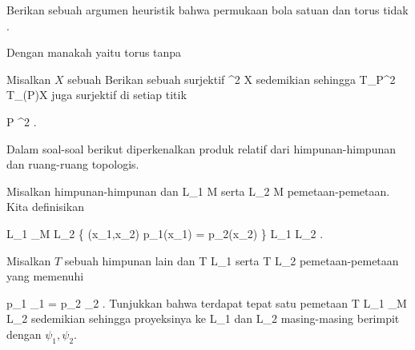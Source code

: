 {}
{

Berikan sebuah argumen heuristik bahwa permukaan bola satuan
 dan torus
 tidak
.

}
{} {}

{}
{

Dengan
manakah
 yaitu torus tanpa

}
{} {}

{}
{

Misalkan $X$ sebuah
Berikan sebuah
surjektif
\maabbdisp {\varphi} {\R^2} {X
} {}
sedemikian sehingga
 { T_P\R^2 } { T_{\varphi(P)}X
} {}
juga surjektif di setiap titik

\mavergleichskette
{\vergleichskette
{ P
}
{ \in }{ \R^2
}
{  }{
}
{    }{
}
{   }{
}
}
{}{}{}.

}
{} {}

Dalam soal-soal berikut diperkenalkan produk relatif dari himpunan-himpunan dan ruang-ruang topologis.

{}
{

Misalkan
 himpunan-himpunan dan
 {L_1 } { M
} {}
serta
 {L_2 } { M
} {}
pemetaan-pemetaan. Kita definisikan

\mavergleichskettedisp
{\vergleichskette
{L_1 \times_M L_2
}
{ } { \left\{ (x_1,x_2)  \mid   p_1(x_1) = p_2(x_2)         \right\}
}
{ \subseteq} { L_1 \times L_2
}
{ } {
}
{ } {
}
}
{}{}{.}
 {Misalkan $T$ sebuah himpunan lain dan
 { T } { L_1
} {}
serta
 { T } { L_2
} {}
pemetaan-pemetaan yang memenuhi

\mavergleichskettedisp
{\vergleichskette
{ p_1 \circ \psi_1
}
{ =} { p_2 \circ \psi_2
}
{ } {
}
{ } {
}
{ } {}
}
{}{}{.}
Tunjukkan bahwa terdapat tepat satu pemetaan
\maabbdisp {\psi} { T } { L_1 \times_M L_2
} {}
sedemikian sehingga proyeksinya ke
\mathkor {} {L_1} {dan} {L_2} {}
masing-masing berimpit dengan $\psi_1,\psi_2$.
}

}
{} {}

